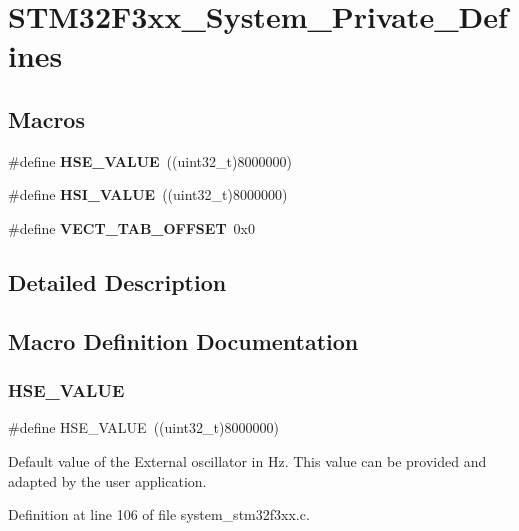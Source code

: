 \section{S\+T\+M32\+F3xx\+\_\+\+System\+\_\+\+Private\+\_\+\+Defines}
\label{group___s_t_m32_f3xx___system___private___defines}
\subsection*{Macros}
\begin{DoxyCompactItemize}
\item 
\#define \textbf{ H\+S\+E\+\_\+\+V\+A\+L\+UE}~((uint32\+\_\+t)8000000)
\item 
\#define \textbf{ H\+S\+I\+\_\+\+V\+A\+L\+UE}~((uint32\+\_\+t)8000000)
\item 
\#define \textbf{ V\+E\+C\+T\+\_\+\+T\+A\+B\+\_\+\+O\+F\+F\+S\+ET}~0x0
\end{DoxyCompactItemize}


\subsection{Detailed Description}


\subsection{Macro Definition Documentation}
\mbox{\label{group___s_t_m32_f3xx___system___private___defines_gaeafcff4f57440c60e64812dddd13e7cb}} 
\subsubsection{H\+S\+E\+\_\+\+V\+A\+L\+UE}
{\footnotesize\ttfamily \#define H\+S\+E\+\_\+\+V\+A\+L\+UE~((uint32\+\_\+t)8000000)}

Default value of the External oscillator in Hz. This value can be provided and adapted by the user application. 

Definition at line 106 of file system\+\_\+stm32f3xx.\+c.


